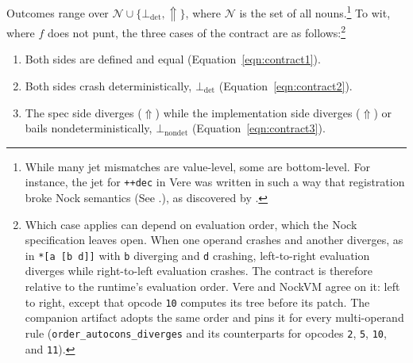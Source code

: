 \documentclass[twoside]{article}
\begin{document}
\noindent
Outcomes range over $\mathcal{N} \cup \{\bot_\text{det}, \Uparrow\}$, where $\mathcal{N}$ is the set of all nouns.\footnote{While many jet mismatches are value-level, some are bottom-level.  For instance, the jet for \texttt{++dec} in Vere was written in such a way that registration broke Nock semantics (See .), as discovered by .}  To wit, where $f$ does not punt, the three cases of the contract are as follows:\footnote{Which case applies can depend on evaluation order, which the Nock specification leaves open.  When one operand crashes and another diverges, as in \texttt{*[a [b d]]} with \texttt{b} diverging and \texttt{d} crashing, left-to-right evaluation diverges while right-to-left evaluation crashes.  The contract is therefore relative to the runtime's evaluation order.  Vere and NockVM agree on it:  left to right, except that opcode \texttt{10} computes its tree before its patch.  The companion artifact adopts the same order and pins it for every multi-operand rule (\mbox{\texttt{order\_autocons\_diverges}} and its counterparts for opcodes \texttt{2}, \texttt{5}, \texttt{10}, and \texttt{11}).}

\begin{enumerate}
  \item  Both sides are defined and equal (Equation~\ref{eqn:contract1}).
  \item  Both sides crash deterministically, $\bot_\text{det}$ (Equation~\ref{eqn:contract2}).
  \item  The spec side diverges ($\Uparrow$) while the implementation side diverges ($\Uparrow$) or bails nondeterministically, $\bot_\text{nondet}$ (Equation~\ref{eqn:contract3}).
\end{enumerate}
\end{document}
